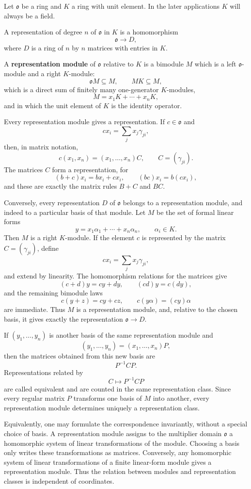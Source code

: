 \documentclass[11pt]{article}
\begin{document}
Let \(\mathfrak{o}\) be a ring and \(K\) a ring with unit element. In
the later applications \(K\) will always be a field.

A representation of degree \(n\) of \(\mathfrak{o}\) in \(K\) is a
homomorphism \[
  \mathfrak{o}\to D,
\] where \(D\) is a ring of \(n\) by \(n\) matrices with entries in
\(K\).

A \textbf{representation module} of \(\mathfrak{o}\) relative to \(K\)
is a bimodule \(M\) which is a left \(\mathfrak{o}\)-module and a right
\(K\)-module: \[
  \mathfrak{o}M\subseteq M,
  \qquad
  MK\subseteq M,
\] which is a direct sum of finitely many one-generator \(K\)-modules,
\[
  M=x_1K+\cdots+x_nK,
\] and in which the unit element of \(K\) is the identity operator.

Every representation module gives a representation. If
\(c\in\mathfrak{o}\) and \[
  cx_i=\sum_j x_j\gamma_{ji},
\] then, in matrix notation, \[
  c(x_1,
x_n)=(x_1,\ldots,x_n)C,
  \qquad C=(\gamma_{ji}).
\] The matrices \(C\) form a representation, for \[
  (b+c)x_i=bx_i+cx_i,
  \qquad
  (bc)x_i=b(cx_i),
\] and these are exactly the matrix rules \(B+C\) and \(BC\).

Conversely, every representation \(D\) of \(\mathfrak{o}\) belongs to a
representation module, and indeed to a particular basis of that module.
Let \(M\) be the set of formal linear forms \[
  y=x_1\alpha_1+\cdots+x_n\alpha_n,
  \qquad \alpha_i\in K.
\] Then \(M\) is a right \(K\)-module. If the element \(c\) is
represented by the matrix \(C=(\gamma_{ji})\), define \[
  cx_i=\sum_j x_j\gamma_{ji},
\] and extend by linearity. The homomorphism relations for the matrices
give \[
  (c+d)y=cy+dy,
  \qquad
  (cd)y=c(dy),
\] and the remaining bimodule laws \[
  c(y+z)=cy+cz,
  \qquad
  c(y\alpha)=(cy)\alpha
\] are immediate. Thus \(M\) is a representation module, and, relative
to the chosen basis, it gives exactly the representation
\(\mathfrak{o}\to D\).

If \((y_1,\ldots,y_n)\) is another basis of the same representation
module and \[
  (y_1,\ldots,y_n)=(x_1,\ldots,x_n)P,
\] then the matrices obtained from this new basis are \[
  P^{-1}CP.
\] Representations related by \[
  C\mapsto P^{-1}CP
\] are called equivalent and are counted in the same representation
class. Since every regular matrix \(P\) transforms one basis of \(M\)
into another, every representation module determines uniquely a
representation class.

Equivalently, one may formulate the correspondence invariantly, without
a special choice of basis. A representation module assigns to the
multiplier domain \(\mathfrak{o}\) a homomorphic system of linear
transformations of the module. Choosing a basis only writes these
transformations as matrices. Conversely, any homomorphic system of
linear transformations of a finite linear-form module gives a
representation module. Thus the relation between modules and
representation classes is independent of coordinates.
\end{document}
